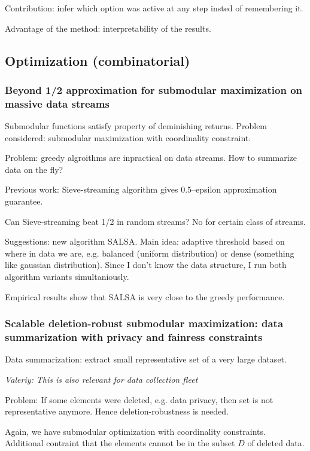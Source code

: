 \documentclass[11pt,oneside,a4paper]{scrartcl}
\newcommand{\valeriy}[1]{{\color{blue}\textit{Valeriy: #1}}}
\begin{document}
Contribution: infer which option was active at any step insted of
remembering it.

Advantage of the method: interpretability of the results.

\subsection{Optimization (combinatorial)}
\label{sec:optim-comb}

\subsubsection{Beyond 1/2 approximation for submodular maximization on
  massive data streams}
\label{sec:beyond-12-appr}

Submodular functions satisfy property of deminishing returns.  Problem
considered: submodular maximization with coordinality constraint.

Problem: greedy algroithms are inpractical on data streams. How to
summarize data on the fly?

Previous work: Sieve-streaming algorithm gives 0.5--epsilon
approximation guarantee.

Can Sieve-streaming beat 1/2 in random streams? No for certain class
of streams.

Suggestions: new algorithm SALSA. Main idea: adaptive threshold based
on where in data we are, e.g. balanced (uniform distribution) or dense
(something like gaussian distribution). Since I don't know the data
structure, I run both algorithm variants simultaniously.

Empirical results show that SALSA is very close to the greedy performance.


\subsubsection{Scalable deletion-robust submodular maximization: data
  summarization with privacy and fainress constraints}
\label{sec:scal-delet-sobm}

Data summarization: extract small representative set of a
very large dataset.

\valeriy{This is also relevant for data collection fleet}

Problem: If some elements were deleted, e.g. data privacy, then set is
not representative anymore. Hence deletion-robustness is needed. 

Again, we have submodular optimization with coordinality
constraints. Additional contraint that the elements cannot be in the
subset $D$ of deleted data.
\end{document}
